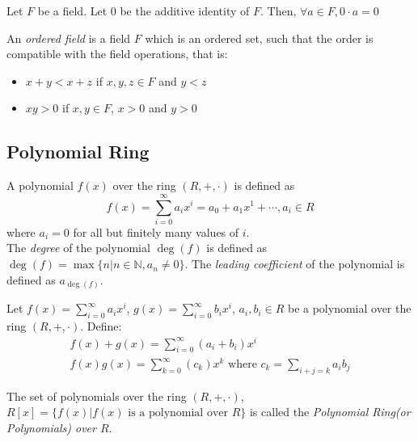 \documentclass{report}
\begin{document}
		\begin{thm}
			Let $F$ be a field. Let $0$ be the additive identity of $F$. Then, $\forall a \in F, 0 \cdot a = 0$
		\end{thm}
		
		\begin{defn} \label{def_ordered_field}
			An \emph{ordered field} is a field $F$ which is an ordered set, such that the order is compatible with the field operations, that is:
			\begin{itemize}
				\item $x+y<x+z$ if $x,y,z \in F$ and $y<z$
				\item $xy>0$ if $x,y \in F$, $x>0$ and $y>0$
			\end{itemize}
			\end{defn}
	
		\subsection{Polynomial Ring}
		\begin{defn} \label{def_polynomial}
			A polynomial $f(x)$ over the ring $(R,+,\cdot)$ is defined as
			\begin{displaymath}
				f(x)=\sum_{i=0}^{\infty}a_ix^i=a_0+a_1x^1+\cdots,a_i\in R
			\end{displaymath}
			where $a_i=0$ for all but finitely many values of $i$.\\
			The \emph{degree} of the polynomial $\deg(f)$ is defined as $\deg(f)=\max\{n|n\in\mathbb{N}, a_n\ne0 \}$.
			The \emph{leading coefficient} of the polynomial is defined as $a_{\deg(f)}$.
		\end{defn}

		\begin{defn} \label{def_add_mult_polynomial}
			Let $f(x)=\sum_{i=0}^{\infty}a_ix^i$, $g(x)=\sum_{i=0}^{\infty}b_ix^i$, $a_i,b_i \in R$ be a polynomial over the ring $(R,+,\cdot)$. Define:
			\begin{gather*}
				f(x)+g(x)=\sum_{i=0}^{\infty}(a_i+b_i)x^i\\
				f(x)g(x)=\sum_{k=0}^{\infty}(c_k)x^k \text{ where } c_k=\sum_{i+j=k}a_ib_j
			\end{gather*}
		\end{defn}

		\begin{defn} \label{def_polynomial_ring}
			The set of polynomials over the ring $(R,+,\cdot)$, $R[x]=\{f(x)|f(x) \text{ is a polynomial over } R \}$ is called the \emph{Polynomial Ring(or Polynomials) over $R$}.
		\end{defn}
\end{document}

